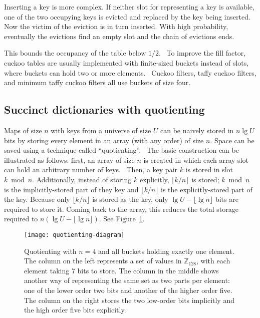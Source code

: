 \documentclass[sigconf, nonacm]{acmart}
\newcommand{\ints}{\mathbb{Z}}
\begin{document}
Inserting a key is more complex.
If neither slot for representing a key is available, one of the two occupying keys is evicted and replaced by the key being inserted.
Now the victim of the eviction is in turn inserted.
With high probability, eventually the evictions find an empty slot and the chain of evictions ends.

This bounds the occupancy of the table below $1/2$.~\cite{cuckoo-journal,load-thresholds}
To improve the fill factor, cuckoo tables are usually implemented with finite-sized buckets instead of slots, where buckets can hold two or more elements.~\cite{buckets,load-thresholds}
Cuckoo filters, taffy cuckoo filters, and minimum taffy cuckoo filters all use buckets of size four.~\cite{cuckoo}

\subsection{Succinct dictionaries with quotienting}
\label{quotienting}

Maps of size $n$ with keys from a universe of size $U$ can be naively stored in $n \lg U$ bits by storing every element in an array (with any order) of size $n$.
Space can be saved using a technique called ``quotienting''.~\cite{knuth,quotient-filter}
The basic construction can be illustrated as follows:
first, an array of size $n$ is created in which each array slot can hold an arbitrary number of keys.~\cite{raman-practical}
Then, a key pair $k$ is stored in slot $k \bmod n$.
Additionally, instead of storing $k$ explicitly, $\lfloor k / n \rfloor$ is stored;
$k \bmod n$ is the implicitly-stored part of they key and $\lfloor k / n \rfloor$ is the explicitly-stored part of the key.
Because only $\lfloor k / n \rfloor$ is stored as the key, only $\lg U - \lfloor \lg n \rfloor$ bits are required to store it.
Coming back to the array, this reduces the total storage required to $n (\lg U - \lfloor \lg n \rfloor)$.
See Figure~\ref{quotienting-figure}.

\begin{figure}
\texttt{[image: quotienting-diagram]}
\caption{\label{quotienting-figure}
Quotienting with $n=4$ and all buckets holding exactly one element.
The column on the left represents a set of values in $\ints_{128}$, with each element taking 7 bits to store.
The column in the middle shows another way of representing the same set as two parts per element: one of the lower order two bits and another of the higher order five.
The column on the right stores the two low-order bits implicitly and the high order five bits explicitly.
}
\end{figure}
\end{document}
